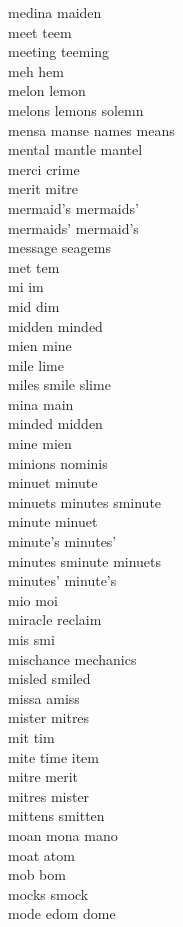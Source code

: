 medina maiden\\
meet teem\\
meeting teeming\\
meh hem\\
melon lemon\\
melons lemons solemn\\
mensa manse names means\\
mental mantle mantel\\
merci crime\\
merit mitre\\
mermaid's mermaids'\\
mermaids' mermaid's\\
message seagems\\
met tem\\
mi im\\
mid dim\\
midden minded\\
mien mine\\
mile lime\\
miles smile slime\\
mina main\\
minded midden\\
mine mien\\
minions nominis\\
minuet minute\\
minuets minutes sminute\\
minute minuet\\
minute's minutes'\\
minutes sminute minuets\\
minutes' minute's\\
mio moi\\
miracle reclaim\\
mis smi\\
mischance mechanics\\
misled smiled\\
missa amiss\\
mister mitres\\
mit tim\\
mite time item\\
mitre merit\\
mitres mister\\
mittens smitten\\
moan mona mano\\
moat atom\\
mob bom\\
mocks smock\\
mode edom dome\\
